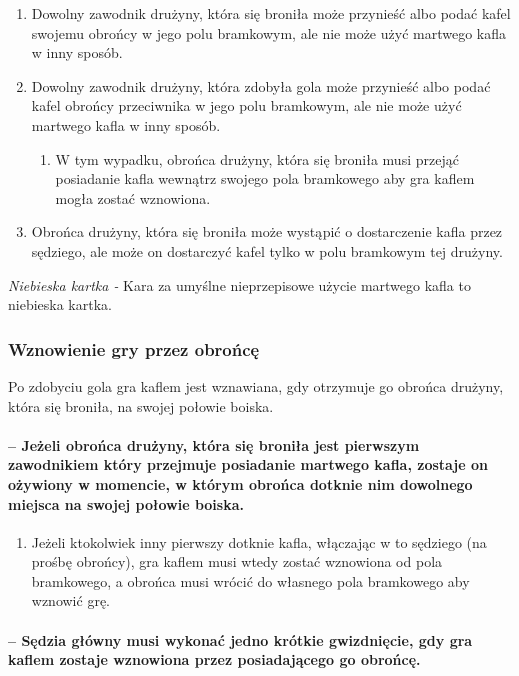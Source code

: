 \documentclass[12pt]{article}
\begin{document}
\begin{enumerate}
\item
  Dowolny zawodnik drużyny, która się broniła może przynieść albo podać
  kafel swojemu obrońcy w jego polu bramkowym, ale nie może użyć
  martwego kafla w inny sposób.
\item
  Dowolny zawodnik drużyny, która zdobyła gola może przynieść albo podać
  kafel obrońcy przeciwnika w jego polu bramkowym, ale nie może użyć
  martwego kafla w inny sposób.

  \begin{enumerate}
  \item
        W tym wypadku, obrońca drużyny, która się broniła musi przejąć
    posiadanie kafla wewnątrz swojego pola bramkowego aby gra kaflem
    mogła zostać wznowiona.
      \end{enumerate}
\item
  Obrońca drużyny, która się broniła może wystąpić o dostarczenie kafla
  przez sędziego, ale może on dostarczyć kafel tylko w polu bramkowym
  tej drużyny.
\end{enumerate}

\emph{Niebieska kartka -} Kara za umyślne nieprzepisowe użycie martwego
kafla to niebieska kartka.

\subsubsection{Wznowienie gry przez obrońcę}
Po zdobyciu gola gra
kaflem jest wznawiana, gdy otrzymuje go obrońca drużyny, która się
broniła, na swojej połowie boiska.

\paragraph{ -- Jeżeli obrońca drużyny, która się broniła jest
pierwszym zawodnikiem który przejmuje posiadanie martwego kafla, zostaje
on ożywiony w momencie, w którym obrońca dotknie nim dowolnego miejsca
na swojej połowie boiska.}

\begin{enumerate}
\item
    Jeżeli ktokolwiek inny pierwszy dotknie kafla, włączając w to sędziego
  (na prośbę obrońcy), gra kaflem musi wtedy zostać wznowiona od pola
  bramkowego, a obrońca musi wrócić do własnego pola bramkowego aby
  wznowić grę.
  \end{enumerate}

\paragraph{ -- Sędzia główny musi wykonać jedno krótkie
gwizdnięcie, gdy gra kaflem zostaje wznowiona przez posiadającego go
obrońcę.}
\end{document}

